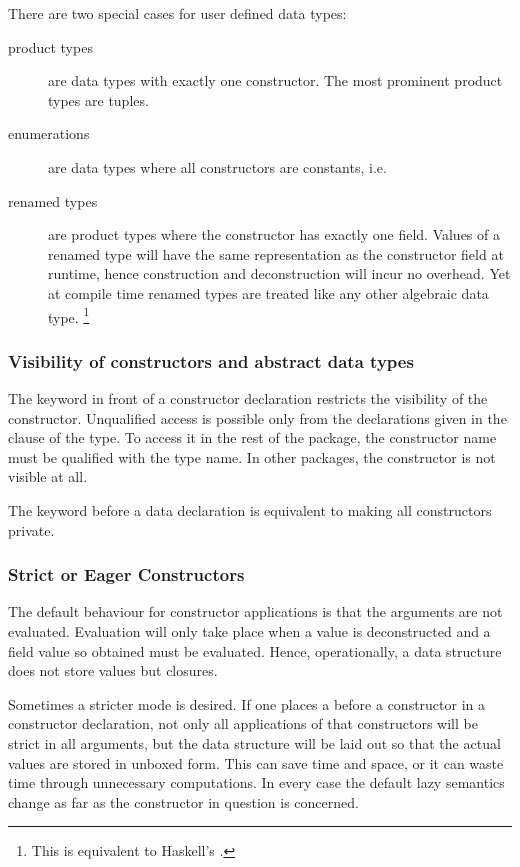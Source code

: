 There are two special cases for user defined data types:
\begin{description}
\item [product types] are data types with exactly one constructor. The most prominent product types are tuples.
\item [enumerations] are data types where all constructors are constants, i.e. 
\item [renamed types] are product types where the constructor has exactly one field. Values of a renamed type will have the same representation as the constructor field at runtime, hence construction and deconstruction will incur no overhead. Yet at compile time renamed types are treated like any other algebraic data type.
\footnote{This is equivalent to Haskell's .}
\end{description}

\subsubsection{Visibility of constructors and abstract data types}

The keyword  in front of a constructor declaration restricts the visibility of the constructor. Unqualified access is possible only from the declarations given in the  clause of the type. To access it in the rest of the package, the constructor name must be qualified with the type name. In other packages, the constructor is not visible at all.

The keyword  before a data declaration is equivalent to making all constructors private.

\subsubsection{Strict or Eager Constructors}

The default behaviour for constructor applications is that the arguments are not evaluated. Evaluation will only take place when a value is deconstructed and a field value so obtained must be evaluated. Hence, operationally, a data structure does not store values but closures.

Sometimes a stricter mode is desired. If one places a \sym{!} before a constructor in a constructor declaration, not only all applications of that constructors will be strict in all arguments, but the data structure will be laid out so that the actual values are stored in unboxed form. This can save time and space, or it can waste time through unnecessary computations. In every case the default lazy semantics change as far as the constructor in question is concerned. 

